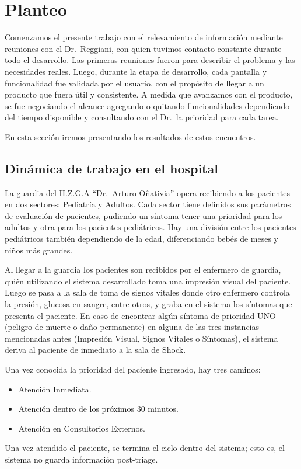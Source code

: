\section{Planteo}

Comenzamos el presente trabajo con el relevamiento de información mediante reuniones con el Dr.\ Reggiani, con quien tuvimos contacto constante durante todo el desarrollo. Las primeras reuniones fueron para describir el problema y las necesidades reales. Luego, durante la etapa de desarrollo, cada pantalla y funcionalidad fue validada por el usuario, con el propósito de llegar a un producto que fuera útil y consistente. A medida que avanzamos con el producto, se fue negociando el alcance agregando o quitando funcionalidades dependiendo del tiempo disponible y consultando con el Dr.\ la prioridad para cada tarea.

En esta sección iremos presentando los resultados de estos encuentros.


\subsection{Dinámica de trabajo en el hospital}
La guardia del H.Z.G.A ``Dr.\ Arturo Oñativia'' opera recibiendo a los pacientes en dos sectores: Pediatría y Adultos. Cada sector tiene definidos sus parámetros de evaluación de pacientes, pudiendo un síntoma tener una prioridad para los adultos y otra para los pacientes pediátricos. Hay una división entre los pacientes pediátricos también dependiendo de la edad, diferenciando bebés de meses y niños más grandes.

Al llegar a la guardia los pacientes son recibidos por el enfermero de guardia, quién utilizando el sistema desarrollado toma una impresión visual del paciente. Luego se pasa a la sala de toma de signos vitales donde otro enfermero controla la presión, glucosa en sangre, entre otros, y graba en el sistema los síntomas que presenta el paciente. En caso de encontrar algún síntoma de prioridad UNO (peligro de muerte o daño permanente) en alguna de las tres instancias mencionadas antes (Impresión Visual, Signos Vitales o Síntomas), el sistema deriva al paciente de inmediato a la sala de Shock.  

Una vez conocida la prioridad del paciente ingresado, hay tres caminos: 
\begin{itemize}
\item Atención Inmediata.
\item Atención dentro de los próximos 30 minutos. 
\item Atención en Consultorios Externos.
\end{itemize}
Una vez atendido el paciente, se termina el ciclo dentro del sistema; esto es, el sistema no guarda información post-triage. 



